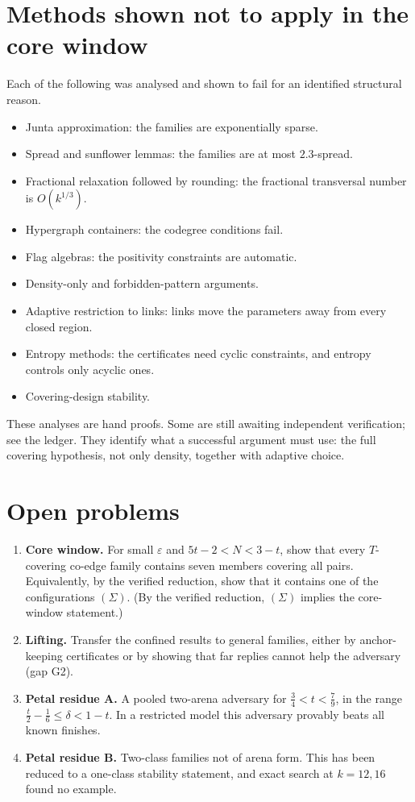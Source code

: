 \documentclass[11pt]{article}
\begin{document}
\section{Methods shown not to apply in the core window}
Each of the following was analysed and shown to fail for an identified structural reason.
\begin{itemize}
\item Junta approximation: the families are exponentially sparse.
\item Spread and sunflower lemmas: the families are at most $2.3$-spread.
\item Fractional relaxation followed by rounding: the fractional transversal number is $O(k^{1/3})$.
\item Hypergraph containers: the codegree conditions fail.
\item Flag algebras: the positivity constraints are automatic.
\item Density-only and forbidden-pattern arguments.
\item Adaptive restriction to links: links move the parameters away from every closed region.
\item Entropy methods: the certificates need cyclic constraints, and entropy controls only acyclic ones.
\item Covering-design stability.
\end{itemize}
These analyses are hand proofs. Some are still awaiting independent verification; see the ledger. They identify what a
successful argument must use: the full covering hypothesis, not only density, together with adaptive choice.

\section{Open problems}
\begin{enumerate}
\item \textbf{Core window.} For small $\varepsilon$ and $5t-2<N<3-t$, show that every $T$-covering co-edge family
contains seven members covering all pairs. Equivalently, by the verified reduction, show that it contains one of the
configurations $(\Sigma)$. (By the verified reduction, $(\Sigma)$ implies the core-window statement.)
\item \textbf{Lifting.} Transfer the confined results to general families, either by anchor-keeping certificates or by
showing that far replies cannot help the adversary (gap G2).
\item \textbf{Petal residue A.} A pooled two-arena adversary for $\tfrac34<t<\tfrac79$, in the range
$\tfrac t2-\tfrac16\le\delta<1-t$. In a restricted model this adversary provably beats all known finishes.
\item \textbf{Petal residue B.} Two-class families not of arena form. This has been reduced to a one-class stability
statement, and exact search at $k=12,16$ found no example.
\end{enumerate}
\end{document}
